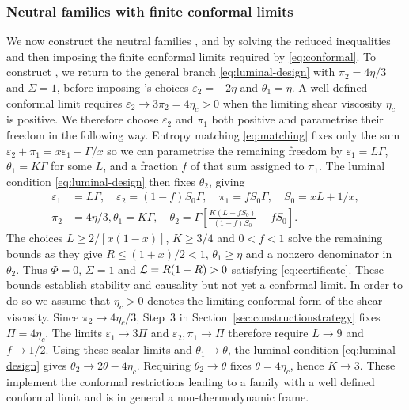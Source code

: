 \subsubsection{Neutral families with finite conformal limits}
\label{sec:conformal-construction}
We now construct the neutral families ,  and  by solving the reduced inequalities and then
imposing the finite conformal limits required by \eqref{eq:conformal}. To construct , we return to the general branch \eqref{eq:luminal-design}
with $\pi_2=4\eta/3$ and $\Sigma=1$, before imposing 's choices
$\varepsilon_2=-2\eta$ and $\theta_1=\eta$.
A well defined conformal limit requires $\varepsilon_2\to3\pi_2=4\eta_c>0$
when the limiting shear viscosity $\eta_c$ is positive. We therefore choose $\varepsilon_2$ and $\pi_1$ both positive and parametrise their freedom in the following way.
Entropy matching \eqref{eq:matching}  fixes only the sum
$\varepsilon_2+\pi_1=x\varepsilon_1+\Gamma/x$ so we can parametrise the remaining freedom by
$\varepsilon_1=L\Gamma$, $\theta_1=K\Gamma$ for some $L$, and a fraction $f$ of
that sum assigned to $\pi_1$. The luminal condition
\eqref{eq:luminal-design} then fixes $\theta_2$, giving
\begin{align}
 \varepsilon_1&=L\Gamma,\quad\varepsilon_2=(1-f)S_0\Gamma,\quad \pi_1=fS_0\Gamma, \quad S_0=xL+1/x,\nonumber\\
 \pi_2&=4\eta/3,\theta_1=K\Gamma,\quad  \theta_2=\Gamma\left[\frac{K(L-fS_0)}{(1-f)S_0}-fS_0\right].\label{eq:AG}
\end{align}
The choices
$L\geq2/[x(1-x)]$, $K\geq3/4$ and $0<f<1$ solve the remaining bounds as they
 give $R\leq(1+x)/2<1$, $\theta_1\geq\eta$ and a nonzero
denominator in $\theta_2$. Thus $\Phi=0$, $\Sigma=1$ and
$\mathcal L=R(1-R)>0$ satisfying \eqref{eq:certificate}. These bounds establish stability and causality but not yet a conformal limit. In order to do so we assume that  $\eta_c>0$ denotes the limiting conformal form of the shear viscosity. Since
$\pi_2\to4\eta_c/3$, Step~3 in Section~\ref{sec:constructionstrategy} fixes $\Pi=4\eta_c$.
The limits $\varepsilon_1\to3\Pi$ and
$\varepsilon_2,\pi_1\to\Pi$ therefore require $L\to9$ and $f\to1/2$.
Using these scalar limits and $\theta_1\to\theta$, the luminal
condition \eqref{eq:luminal-design} gives $\theta_2\to2\theta-4\eta_c$. Requiring
$\theta_2\to\theta$ fixes $\theta=4\eta_c$, hence $K\to3$.
These implement the conformal restrictions leading to a family  with a well defined conformal limit and is in general a non-thermodynamic frame.

